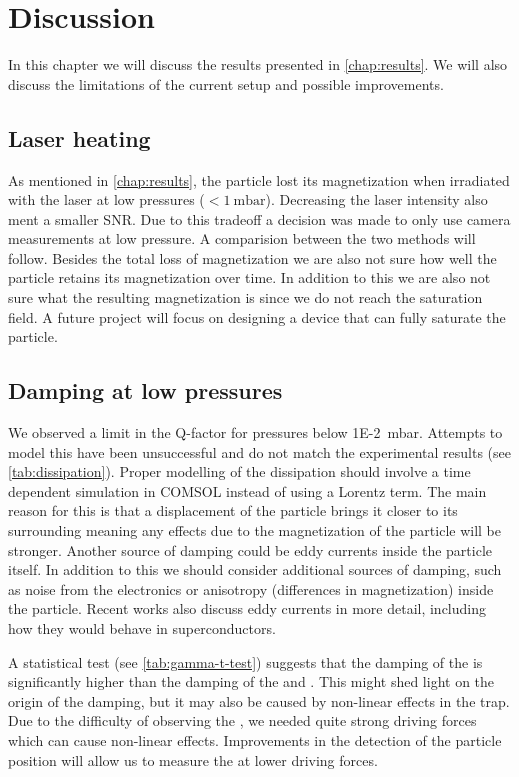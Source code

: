 \chapter{Discussion}
\label{chap:discussion}
In this chapter we will discuss the results presented in \autoref{chap:results}. We will also discuss the limitations of the current setup and possible improvements.

\section*{Laser heating}
As mentioned in \autoref{chap:results}, the particle lost its magnetization when irradiated with the laser at low pressures ($<\qty{1}{\milli\bar}$). Decreasing the laser intensity also ment a smaller SNR. Due to this tradeoff a decision was made to only use camera measurements at low pressure. A comparision between the two methods will follow. Besides the total loss of magnetization we are also not sure how well the particle retains its magnetization over time. In addition to this we are also not sure what the resulting magnetization is since we do not reach the saturation field. A future project will focus on designing a device that can fully saturate the particle.

\section*{Damping at low pressures}
We observed a limit in the Q-factor for pressures below \qty{1E-2}{\milli\bar}. Attempts to model this have been unsuccessful and do not match the experimental results (see \autoref{tab:dissipation}). Proper modelling of the dissipation should involve a time dependent simulation in COMSOL instead of using a Lorentz term. The main reason for this is that a displacement of the particle brings it closer to its surrounding meaning any effects due to the magnetization of the particle will be stronger. Another source of damping could be eddy currents inside the particle itself. In addition to this we should consider additional sources of damping, such as noise from the electronics or anisotropy (differences in magnetization) inside the particle\cite{millen}. Recent works also discuss eddy currents in more detail, including how they would behave in superconductors\cite{fuwa_stable_2023,gutierrez_latorre_chip_2023}.

A statistical test (see \autoref{tab:gamma-t-test}) suggests that the damping of the \zmode is significantly higher than the damping of the \xmode and \ymode. This might shed light on the origin of the damping, but it may also be caused by non-linear effects in the trap. Due to the difficulty of observing the \zmode, we needed quite strong driving forces which can cause non-linear effects. Improvements in the detection of the particle position will allow us to measure the \zmode at lower driving forces.

